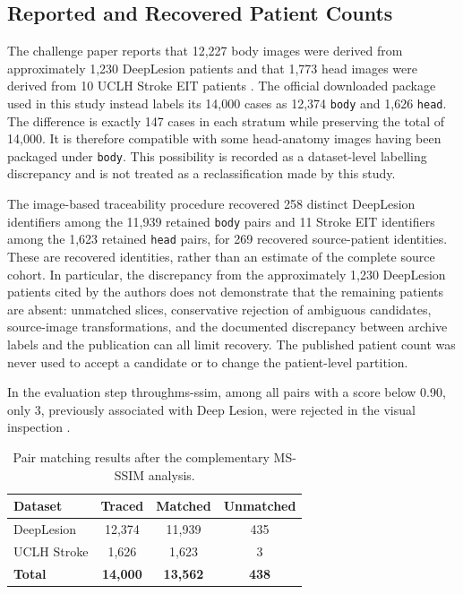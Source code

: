 \subsection{Reported and Recovered Patient Counts}
\label{sec:reported-recovered-patient-counts}

The challenge paper reports that 12,227 body images were derived from approximately 1,230 DeepLesion patients and that 1,773 head images were derived from 10 UCLH Stroke EIT patients \cite{hanedaAAPMCTMetal2025}. The official downloaded package used in this study instead labels its 14,000 cases as 12,374 \texttt{body} and 1,626 \texttt{head}. The difference is exactly 147 cases in each stratum while preserving the total of 14,000. It is therefore compatible with some head-anatomy images having been packaged under \texttt{body}. This possibility is recorded as a dataset-level labelling discrepancy and is not treated as a reclassification made by this study.

The image-based traceability procedure recovered 258 distinct DeepLesion identifiers among the 11,939 retained \texttt{body} pairs and 11 Stroke EIT identifiers among the 1,623 retained \texttt{head} pairs, for 269 recovered source-patient identities. These are recovered identities, rather than an estimate of the complete source cohort. In particular, the discrepancy from the approximately 1,230 DeepLesion patients cited by the authors does not demonstrate that the remaining patients are absent: unmatched slices, conservative rejection of ambiguous candidates, source-image transformations, and the documented discrepancy between archive labels and the publication can all limit recovery. The published patient count was never used to accept a candidate or to change the patient-level partition.

In the evaluation step through\acrshort{ms-ssim}, among all pairs with a score below 0.90, only 3, previously associated with Deep Lesion, were rejected in the visual inspection .

\begin{table}[H]
    \centering
    \begin{tabular}{lccc}
        \hline
        \textbf{Dataset} & \textbf{Traced} & \textbf{Matched} & \textbf{Unmatched} \\
        \hline
        DeepLesion & 12,374 & 11,939 & 435 \\
        UCLH Stroke    & 1,626  & 1,623  & 3   \\
        \hline
        \textbf{Total}  & \textbf{14,000} & \textbf{13,562} & \textbf{438} \\
        \hline
    \end{tabular}
    \captionsetup{skip=2pt}
    \caption[Pair matching after MS-SSIM review]{Pair matching results after the complementary MS-SSIM analysis.}
    \label{tab:final-tracking-post-msssim}
\end{table}

